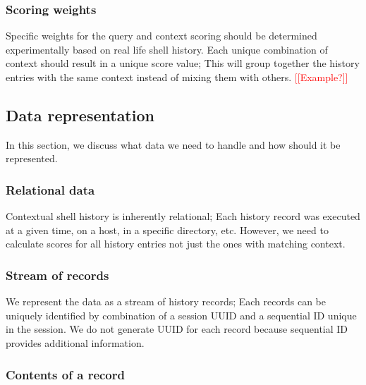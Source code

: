 \documentclass[thesis=M,english]{FITthesis}[2012/10/20]
\newcommand{\redtext}[1]{\textcolor{red}{[[#1]]}}
\begin{document}
\subsubsection{Scoring weights}

Specific weights for the query and context scoring should be determined experimentally based on real life shell history.
Each unique combination of context should result in a unique score value; This will group together the history entries with the same context instead of mixing them with others.
\redtext{Example?}




\subsection{Data representation}

In this section, we discuss what data we need to handle and how should it be represented. 
\subsubsection{Relational data}

Contextual shell history is inherently relational; Each history record was executed at a given time, on a host, in a specific directory, etc. However, we need to calculate scores for all history entries not just the ones with matching context.

\subsubsection{Stream of records}

We represent the data as a stream of history records; Each records can be uniquely identified by combination of a session UUID and a sequential ID unique in the session. We do not generate UUID for each record because sequential ID provides additional information. 

\subsubsection{Contents of a record}
\end{document}
